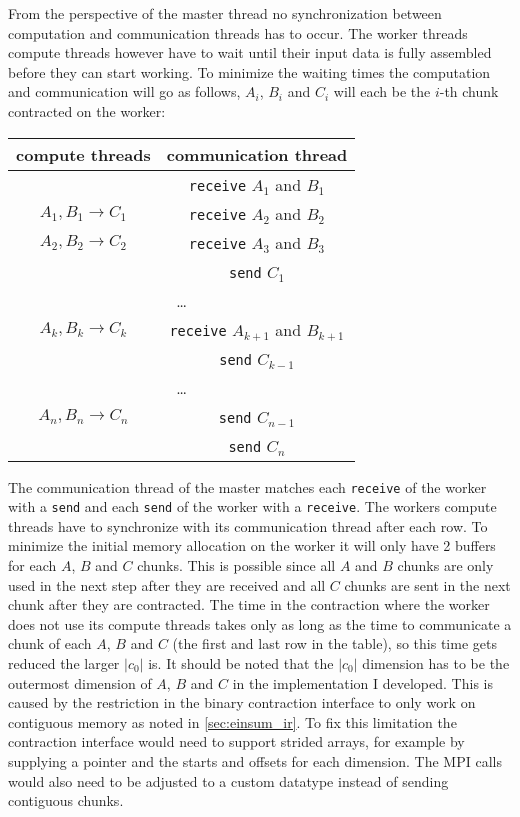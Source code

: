 From the perspective of the master thread no synchronization between computation and communication threads has to occur.
The worker threads compute threads however have to wait until their input data is fully assembled before they can start working.
To minimize the waiting times the computation and communication will go as follows, $A_i$, $B_i$ and $C_i$ will each be the $i$-th chunk contracted on the worker:

\begin{center}
  \begin{tabular}{ |c|c| } 
  \hline
  compute threads & communication thread\\
  \hline
   & \texttt{receive} $A_1$ and $B_1$\\
  \hline
  $A_1,B_1 \rightarrow C_1$ & \texttt{receive} $A_2$ and $B_2$\\
  \hline
  $A_2,B_2 \rightarrow C_2$ & \texttt{receive} $A_3$ and $B_3$\\
  & \texttt{send} $C_1$\\
  \hline
  \multicolumn{2}{|c|}{\dots}\\
  \hline
  $A_k,B_k \rightarrow C_k$ & \texttt{receive} $A_{k+1}$ and $B_{k+1}$\\
  & \texttt{send} $C_{k-1}$\\
  \hline
  \multicolumn{2}{|c|}{\dots}\\
  \hline
  $A_n,B_n \rightarrow C_n$ & \texttt{send} $C_{n-1}$\\
  \hline
  & \texttt{send} $C_n$\\
  \hline
\end{tabular}
\end{center}

The communication thread of the master matches each \texttt{receive} of the worker with a \texttt{send} and each \texttt{send} of the worker with a \texttt{receive}.
The workers compute threads have to synchronize with its communication thread after each row.
To minimize the initial memory allocation on the worker it will only have 2 buffers for each $A$, $B$ and $C$ chunks.
This is possible since all $A$ and $B$ chunks are only used in the next step after they are received and all $C$ chunks are sent in the next chunk after they are contracted.
The time in the contraction where the worker does not use its compute threads takes only as long as the time to communicate a chunk of each $A$, $B$ and $C$ (the first and last row in the table), so this time gets reduced the larger $|c_0|$ is.
It should be noted that the $|c_0|$ dimension has to be the outermost dimension of $A$, $B$ and $C$ in the implementation I developed.
This is caused by the restriction in the binary contraction interface to only work on contiguous memory as noted in \ref{sec:einsum_ir}.
To fix this limitation the contraction interface would need to support strided arrays, for example by supplying a pointer and the starts and offsets for each dimension.
The MPI calls would also need to be adjusted to a custom datatype instead of sending contiguous chunks.
